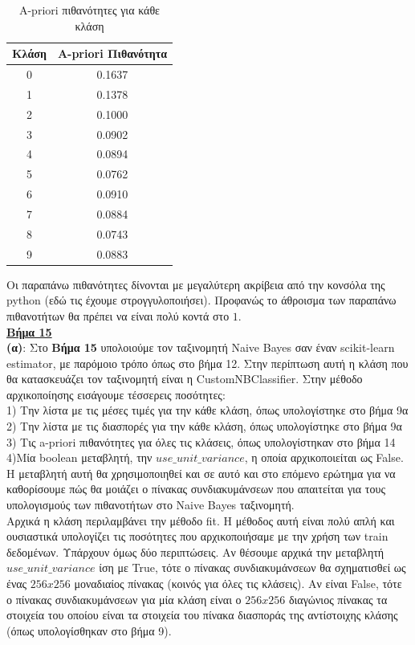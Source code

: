 \documentclass[11pt]{article} %
\begin{document}
\begin{table}[H]
\centering
\begin{tabular}{ c c }
\hline\hline
Κλάση & A-priori Πιθανότητα \\
\hline
0  & 0.1637 \\
1 & 0.1378   \\
2  & 0.1000 \\
3 & 0.0902 \\
4 & 0.0894 \\
5 & 0.0762 \\
6 & 0.0910   \\
7 & 0.0884 \\
8 & 0.0743\\
9 & 0.0883\\
\hline
\end{tabular}
\caption{A-priori πιθανότητες για κάθε κλάση}
\label{table:a_priori}
\end{table}

Οι παραπάνω πιθανότητες δίνονται με μεγαλύτερη ακρίβεια από την κονσόλα της python (εδώ τις έχουμε στρογγυλοποιήσει). Προφανώς το άθροισμα των παραπάνω πιθανοτήτων θα πρέπει να είναι πολύ κοντά στο $1$.\\


\underline{\textbf{Βήμα 15}}\\

\textbf{(α)}: Στο \textbf{Βήμα 15} υπολοιούμε τον ταξινομητή Naive Bayes σαν έναν scikit-learn estimator, με παρόμοιο τρόπο όπως στο βήμα 12. Στην περίπτωση αυτή η κλάση που θα κατασκευάζει τον ταξινομητή είναι η CustomNBClassifier. Στην μέθοδο αρχικοποίησης εισάγουμε τέσσερεις ποσότητες:\\
1) Την λίστα με τις μέσες τιμές για την κάθε κλάση, όπως υπολογίστηκε στο βήμα 9α\\
2) Την λίστα με τις διασπορές για την κάθε κλάση, όπως υπολογίστηκε στο βήμα 9α\\
3) Τις a-priori πιθανότητες για όλες τις κλάσεις, όπως υπολογίστηκαν στο βήμα 14\\
4)Μία boolean μεταβλητή, την $use\_unit\_variance$, η οποία αρχικοποιείται ως False. Η μεταβλητή αυτή θα χρησιμοποιηθεί και σε αυτό και στο επόμενο ερώτημα για να καθορίσουμε πώς θα μοιάζει ο πίνακας συνδιακυμάνσεων που απαιτείται για τους υπολογισμούς των πιθανοτήτων στο Naive Bayes ταξινομητή.\\

Αρχικά η κλάση περιλαμβάνει την μέθοδο fit. Η μέθοδος αυτή είναι πολύ απλή και ουσιαστικά υπολογίζει τις ποσότητες που αρχικοποιήσαμε με την χρήση των train δεδομένων. Υπάρχουν όμως δύο περιπτώσεις. Αν θέσουμε αρχικά την μεταβλητή $use\_unit\_variance$ ίση με True, τότε ο πίνακας συνδιακυμάνσεων θα σχηματισθεί ως ένας $256x256$ μοναδιαίος πίνακας (κοινός για όλες τις κλάσεις). Αν είναι False, τότε ο πίνακας συνδιακυμάνσεων για μία κλάση είναι ο $256x256$ διαγώνιος πίνακας τα στοιχεία του οποίου είναι τα στοιχεία του πίνακα διασποράς της αντίστοιχης κλάσης (όπως υπολογίσθηκαν στο βήμα 9). \\
\end{document}
